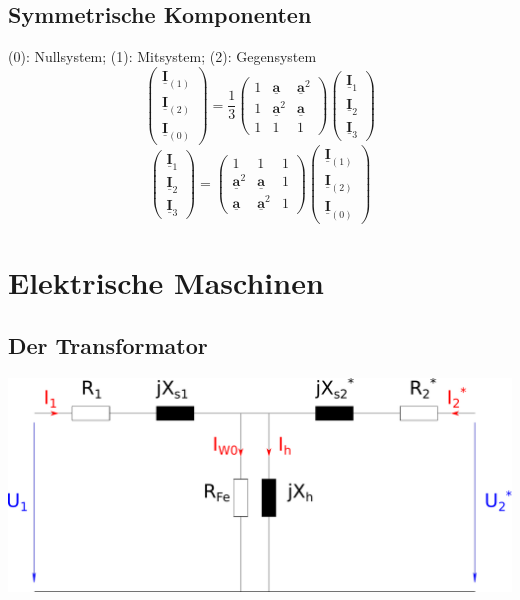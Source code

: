 \documentclass[9pt,a4paper]{scrartcl}
\renewcommand{\vec}[1]{\ensuremath{\underline{\boldsymbol {#1}}}}
\begin{document}
\begin{multicols}{3}
		\subsection{Symmetrische Komponenten}
		(0): Nullsystem; (1): Mitsystem; (2): Gegensystem
		\[\begin{pmatrix} \vec I_{(1)} \\ \vec I_{(2)} \\ \vec I_{(0)} \end{pmatrix} = \frac{1}{3}
		\begin{pmatrix} 1 & \vec a & \vec a^2 \\ 1 & \vec a^2 & \vec a \\ 1 & 1 & 1 \end{pmatrix} 
		\begin{pmatrix} \vec I_1 \\ \vec I_2 \\ \vec I_3 \end{pmatrix}\]
		\[\begin{pmatrix} \vec I_1 \\ \vec I_2 \\ \vec I_3 \end{pmatrix} = 
		\begin{pmatrix} 1 & 1 & 1 \\ \vec a^2 & \vec a & 1 \\ \vec a & \vec a^2 & 1 \end{pmatrix} 
		\begin{pmatrix} \vec I_{(1)} \\ \vec I_{(2)} \\ \vec I_{(0)} \end{pmatrix}\]


	\section{Elektrische Maschinen}
		\subsection{Der Transformator}		
		\includegraphics[scale=.3]{./img/ersatzschaltbild_transformator.pdf} \\


\end{multicols}
\end{document}
